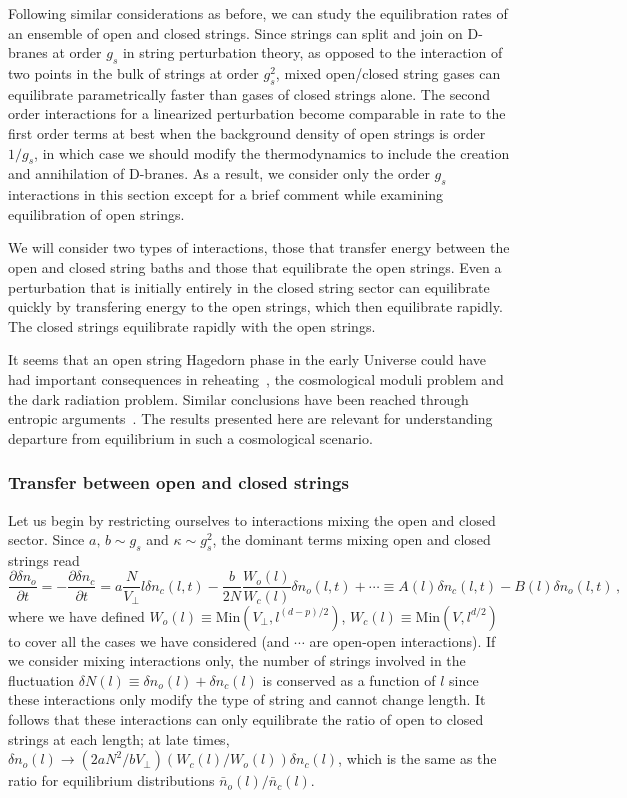 \documentclass[a4paper,11pt]{article}
\begin{document}
Following similar considerations as before, we can study the equilibration rates of an ensemble of open and closed strings.
Since strings can split and join on D-branes at order $g_s$ in string 
perturbation theory, as opposed to the interaction of two points in the
bulk of strings at order $g_s^2$, mixed open/closed string gases can 
equilibrate parametrically faster than gases of closed strings alone.
The second order interactions for a linearized perturbation
become comparable in rate to the first order terms at best when the background
density of open strings is order $1/g_s$, in which case we should modify
the thermodynamics to include the creation and annihilation of D-branes.
As a result, we consider only the order $g_s$ interactions in this section
except for a brief comment while examining equilibration of open strings.

We will consider two types of interactions, those that transfer energy
between the open and closed string baths and those that equilibrate the open
strings. Even a perturbation that is initially entirely in the closed string
sector can equilibrate quickly by transfering energy to the open strings,
which then equilibrate rapidly. The closed strings equilibrate rapidly
with the open strings.

It seems that an open string Hagedorn phase in the early Universe could have had important consequences in reheating~\cite{Frey:2005jk}, the cosmological moduli problem and the dark radiation problem.
Similar conclusions have been reached through entropic arguments~\cite{Frey:2021jyo}. The results presented here are relevant for understanding departure
from equilibrium in such a cosmological scenario.


\subsubsection*{Transfer between open and closed strings}

Let us begin by restricting ourselves to interactions mixing the open and closed sector.
Since $a,\, b\sim g_s$ and $\kappa\sim g_s^2$, the dominant terms mixing open and closed strings read
\begin{equation}\label{eq:transfer}
    \frac{\partial \delta n_o}{\partial t}=-\frac{\partial \delta n_c}{\partial t}=a\frac{N}{V_\perp}l\delta n_c(l,t)-\frac{b}{2N}\frac{W_o(l)}{W_c (l)}\delta n_o(l,t)+\cdots\equiv A(l)\delta n_c(l,t)-B(l)\delta n_o(l,t)\, ,
\end{equation}
where we have defined $W_o(l)\equiv \text{Min}(V_\perp,l^{(d-p)/2})$, $W_c(l)\equiv \text{Min}(V,l^{d/2})$ to cover all the cases we have considered (and $\cdots$
are open-open interactions).
If we consider mixing interactions only, the number of strings involved in the fluctuation 
$\delta N(l)\equiv \delta n_o(l) + \delta n_c(l)$ is conserved as a function of
$l$ since these interactions only modify the type of string and cannot change
length. It follows that these interactions can only equilibrate the
ratio of open to closed strings at each length; at late times,
$\delta n_o(l)\to (2aN^2/bV_\perp)(W_c(l)/W_o(l))\delta n_c(l)$, which is
the same as the ratio for equilibrium distributions $\bar n_o(l)/\bar n_c(l)$.
\end{document}
